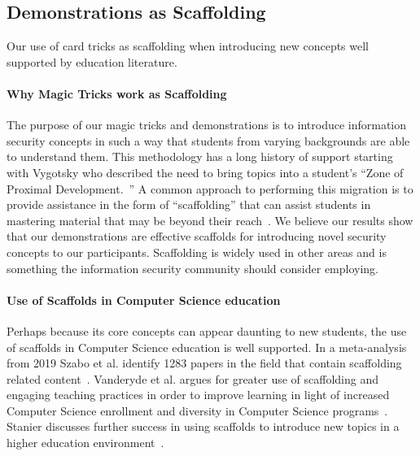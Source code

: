 \subsection{Demonstrations as Scaffolding}

Our use of card tricks as scaffolding when introducing new concepts well
supported by education literature.

\paragraph{Why Magic Tricks work as Scaffolding}
The purpose of our magic tricks and demonstrations is to introduce
information security concepts in such a way that students from varying
backgrounds are able to understand them.  This methodology has a long history of
support starting with Vygotsky who described the need to bring topics into a
student's ``Zone of Proximal Development.~\cite{vygotsky1978}''
A common approach to performing this migration is to provide assistance in the
form of ``scaffolding'' that can assist students in mastering material that may
be beyond their reach~\cite{wood1976role}.  We believe our results show that our
demonstrations are effective scaffolds for introducing novel security concepts
to our participants.  Scaffolding is widely used in other areas and is something
the information security community should consider employing.

\paragraph{Use of Scaffolds in Computer Science education}
Perhaps because its core concepts can appear daunting to new students,
the use of scaffolds in Computer Science education is well supported. In a
meta-analysis from 2019 Szabo et
al. identify 1283 papers in the field that contain scaffolding related
content~\cite{szabometa}.
Vanderyde et al. argues for greater use of scaffolding and
engaging teaching practices in order to improve learning in light of increased
Computer Science enrollment and diversity in Computer Science
programs~\cite{vanderhydescaffolding}.  Stanier discusses further success in
using scaffolds to introduce new topics in a higher education
environment~\cite{stanierhighered}.

